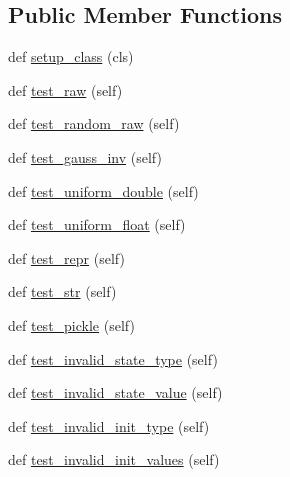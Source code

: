\subsection*{Public Member Functions}
\begin{DoxyCompactItemize}
\item 
def \hyperlink{classnumpy_1_1random_1_1tests_1_1test__direct_1_1Base_abbc39b78cc6b5d72e8b30e46b1803ebb}{setup\+\_\+class} (cls)
\item 
def \hyperlink{classnumpy_1_1random_1_1tests_1_1test__direct_1_1Base_a20df3cb40740d35151cb42b1746d55bc}{test\+\_\+raw} (self)
\item 
def \hyperlink{classnumpy_1_1random_1_1tests_1_1test__direct_1_1Base_a49f2069f786aa354b8ff1868b2da0bd8}{test\+\_\+random\+\_\+raw} (self)
\item 
def \hyperlink{classnumpy_1_1random_1_1tests_1_1test__direct_1_1Base_a3452ea32c48cae62641d1a432ab3b3bc}{test\+\_\+gauss\+\_\+inv} (self)
\item 
def \hyperlink{classnumpy_1_1random_1_1tests_1_1test__direct_1_1Base_a715646cc33b2d35d73ef53a4674a2b0c}{test\+\_\+uniform\+\_\+double} (self)
\item 
def \hyperlink{classnumpy_1_1random_1_1tests_1_1test__direct_1_1Base_a9c62f970c1e7f52a3133aba5083d5ba1}{test\+\_\+uniform\+\_\+float} (self)
\item 
def \hyperlink{classnumpy_1_1random_1_1tests_1_1test__direct_1_1Base_a0b1b371b4a67040d0efef8e76a5796f0}{test\+\_\+repr} (self)
\item 
def \hyperlink{classnumpy_1_1random_1_1tests_1_1test__direct_1_1Base_a6d7ccb2bd206b60c3949a46f25b9a300}{test\+\_\+str} (self)
\item 
def \hyperlink{classnumpy_1_1random_1_1tests_1_1test__direct_1_1Base_ab0d6e2496b262cd1169d0cfa89660a58}{test\+\_\+pickle} (self)
\item 
def \hyperlink{classnumpy_1_1random_1_1tests_1_1test__direct_1_1Base_afb3781910acfb071807d6d0b7e9e513c}{test\+\_\+invalid\+\_\+state\+\_\+type} (self)
\item 
def \hyperlink{classnumpy_1_1random_1_1tests_1_1test__direct_1_1Base_a4a11881c789d962c0798bce363169d4b}{test\+\_\+invalid\+\_\+state\+\_\+value} (self)
\item 
def \hyperlink{classnumpy_1_1random_1_1tests_1_1test__direct_1_1Base_a55f7d16442051fe2bb6a9028f31dbb46}{test\+\_\+invalid\+\_\+init\+\_\+type} (self)
\item 
def \hyperlink{classnumpy_1_1random_1_1tests_1_1test__direct_1_1Base_af67941504ee05bcf4f4b3eecbe84e2ea}{test\+\_\+invalid\+\_\+init\+\_\+values} (self)

\end{DoxyCompactItemize}
